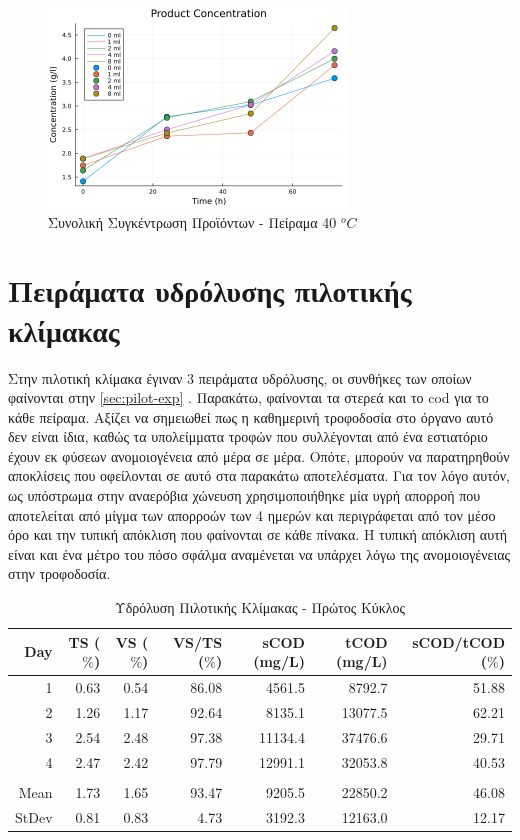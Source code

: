 \documentclass[11pt]{report}
\begin{document}
\begin{enumerate}
\begin{figure}[htbp]
\centering
\includegraphics[width=300px]{../plots/28_11/product_conc_scatter_28_11.png}
\caption{\label{fig:orgbec782f}Συνολική Συγκέντρωση Προϊόντων - Πείραμα 40 \(^oC\)}
\end{figure}
\end{enumerate}

\section{Πειράματα υδρόλυσης πιλοτικής κλίμακας}
\label{sec:orgbcc5d87}
Στην πιλοτική κλίμακα έγιναν 3 πειράματα υδρόλυσης, οι συνθήκες των οποίων φαίνονται στην \autoref{sec:pilot-exp} . Παρακάτω, φαίνονται τα στερεά και το \acrshort{cod} για το κάθε πείραμα. Αξίζει να σημειωθεί πως η καθημερινή τροφοδοσία στο όργανο αυτό δεν είναι ίδια, καθώς τα υπολείμματα τροφών που συλλέγονται από ένα εστιατόριο έχουν εκ φύσεων ανομοιογένεια από μέρα σε μέρα. Οπότε, μπορούν να παρατηρηθούν αποκλίσεις που οφείλονται σε αυτό στα παρακάτω αποτελέσματα. Για τον λόγο αυτόν, ως υπόστρωμα στην αναερόβια χώνευση χρησιμοποιήθηκε μία υγρή απορροή που αποτελείται από μίγμα των απορροών των 4 ημερών και περιγράφεται από τον μέσο όρο και την τυπική απόκλιση που φαίνονται σε κάθε πίνακα. Η τυπική απόκλιση αυτή είναι και ένα μέτρο του πόσο σφάλμα αναμένεται να υπάρχει λόγω της ανομοιογένειας στην τροφοδοσία.

\begin{table}[htbp]
\caption{\label{tab:org071911a}Υδρόλυση Πιλοτικής Κλίμακας - Πρώτος Κύκλος}
\centering
\begin{tabular}{rrrrrrr}
Day & TS (\(\%\)) & VS (\(\%\)) & VS/TS (\(\%\)) & sCOD (mg/L) & tCOD (mg/L) & sCOD/tCOD (\(\%\))\\[0pt]
\hline
1 & 0.63 & 0.54 & 86.08 & 4561.5 & 8792.7 & 51.88\\[0pt]
2 & 1.26 & 1.17 & 92.64 & 8135.1 & 13077.5 & 62.21\\[0pt]
3 & 2.54 & 2.48 & 97.38 & 11134.4 & 37476.6 & 29.71\\[0pt]
4 & 2.47 & 2.42 & 97.79 & 12991.1 & 32053.8 & 40.53\\[0pt]
 &  &  &  &  &  & \\[0pt]
Mean & 1.73 & 1.65 & 93.47 & 9205.5 & 22850.2 & 46.08\\[0pt]
StDev & 0.81 & 0.83 & 4.73 & 3192.3 & 12163.0 & 12.17\\[0pt]
\end{tabular}
\end{table}
\end{document}
